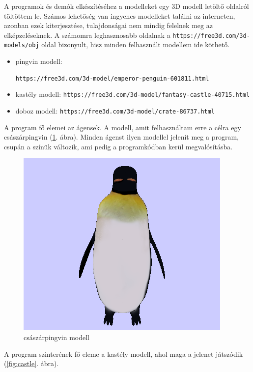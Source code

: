 A programok és demók elkészítéséhez a modelleket egy 3D modell letöltő oldalról töltöttem le. Számos lehetőség van ingyenes modelleket találni az interneten,
azonban ezek kiterjesztése, tulajdonságai nem mindig felelnek meg az elképzeléseknek.
A számomra leghasznosabb oldalnak a \texttt{https://free3d.com/3d-models/obj} oldal bizonyult, hisz minden felhasznált modellem ide köthető.
\begin{itemize}
\item pingvin modell:

\texttt{https://free3d.com/3d-model/emperor-penguin-601811.html}
\item kastély modell: \texttt{https://free3d.com/3d-model/fantasy-castle-40715.html}
\item doboz modell: \texttt{https://free3d.com/3d-model/crate-86737.html}
\end{itemize}

A program fő elemei az ágensek. 
A modell, amit felhasználtam erre a célra egy császárpingvin (\ref{fig:pingvin}. ábra). 
Minden ágenst ilyen modellel jelenít meg a program, csupán a színük változik, ami pedig a programkódban kerül megvalósításba.

\begin{figure}[htp]
    \centering
   	\includegraphics[scale=0.6]{images/pingvin.png}
	\caption{császárpingvin modell}
	\label{fig:pingvin}
\end{figure}

A program szinterének fő eleme a kastély modell, ahol maga a jelenet játszódik (\ref{fig:castle}. ábra).

